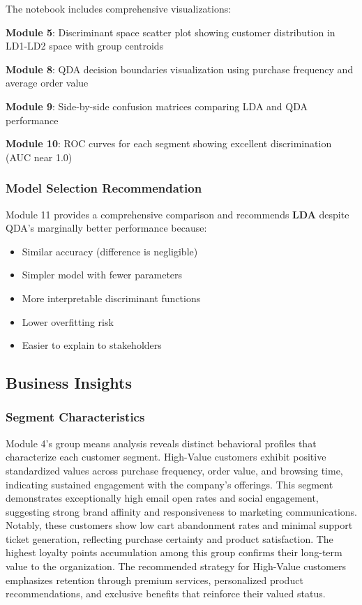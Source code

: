 \documentclass[
]{article}
\begin{document}
The notebook includes comprehensive visualizations:

\textbf{Module 5}: Discriminant space scatter plot showing customer
distribution in LD1-LD2 space with group centroids

\textbf{Module 8}: QDA decision boundaries visualization using purchase
frequency and average order value

\textbf{Module 9}: Side-by-side confusion matrices comparing LDA and QDA
performance

\textbf{Module 10}: ROC curves for each segment showing excellent
discrimination (AUC near 1.0)

\subsubsection{Model Selection Recommendation}

Module 11 provides a comprehensive comparison and recommends
\textbf{LDA} despite QDA's marginally better performance because:

\begin{itemize}
\item
  Similar accuracy (difference is negligible)
\item
  Simpler model with fewer parameters
\item
  More interpretable discriminant functions
\item
  Lower overfitting risk
\item
  Easier to explain to stakeholders
\end{itemize}

\subsection{Business Insights}

\subsubsection{Segment Characteristics}

Module 4's group means analysis reveals distinct behavioral profiles
that characterize each customer segment. High-Value customers exhibit
positive standardized values across purchase frequency, order value, and
browsing time, indicating sustained engagement with the company's
offerings. This segment demonstrates exceptionally high email open rates
and social engagement, suggesting strong brand affinity and
responsiveness to marketing communications. Notably, these customers
show low cart abandonment rates and minimal support ticket generation,
reflecting purchase certainty and product satisfaction. The highest
loyalty points accumulation among this group confirms their long-term
value to the organization. The recommended strategy for High-Value
customers emphasizes retention through premium services, personalized
product recommendations, and exclusive benefits that reinforce their
valued status.
\end{document}
